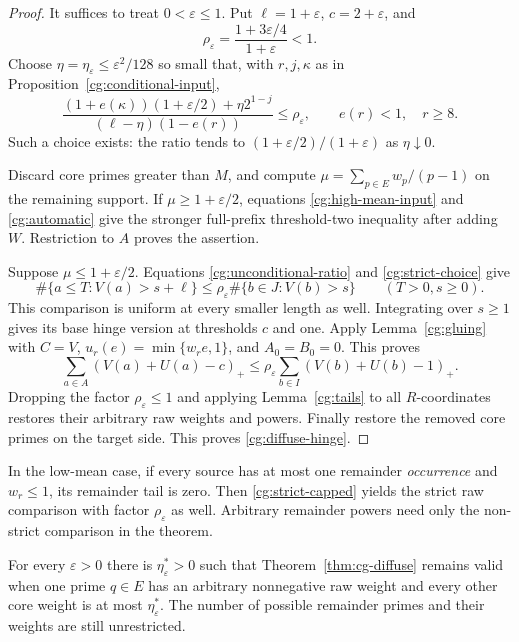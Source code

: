 \begin{proof}
It suffices to treat $0<\varepsilon\le1$. Put
$\ell=1+\varepsilon$, $c=2+\varepsilon$, and
\[
 \rho_\varepsilon=\frac{1+3\varepsilon/4}{1+\varepsilon}<1.
\]
Choose $\eta=\eta_\varepsilon\le\varepsilon^2/128$ so small
that, with $r,j,\kappa$ as in
Proposition~\ref{cg:conditional-input},
\begin{equation}
 \frac{(1+e(\kappa))(1+\varepsilon/2)+\eta2^{1-j}}
      {(\ell-\eta)(1-e(r))}\le\rho_\varepsilon,
 \qquad e(r)<1,\quad r\ge8.
 \label{cg:strict-choice}
\end{equation}
Such a choice exists: the ratio tends to
$(1+\varepsilon/2)/(1+\varepsilon)$ as $\eta\downarrow0$.

Discard core primes greater than $M$, and compute
$\mu=\sum_{p\in E}w_p/(p-1)$ on the remaining support.
If $\mu\ge1+\varepsilon/2$, equations
\eqref{cg:high-mean-input} and \eqref{cg:automatic} give the
stronger full-prefix threshold-two inequality after adding $W$.
Restriction to $A$ proves the assertion.

Suppose $\mu\le1+\varepsilon/2$. Equations
\eqref{cg:unconditional-ratio} and \eqref{cg:strict-choice} give
\[
 \#\{a\le T:V(a)>s+\ell\}
 \le\rho_\varepsilon\#\{b\in J:V(b)>s\}
 \qquad(T>0, s\ge0).
\]
This comparison is uniform at every smaller length as well.
Integrating over $s\ge1$ gives its base hinge version at thresholds
$c$ and one. Apply Lemma~\ref{cg:gluing} with $C=V$,
$u_r(e)=\min\{w_re,1\}$, and $A_0=B_0=0$. This proves
\begin{equation}
 \sum_{a\in A}(V(a)+U(a)-c)_+
 \le\rho_\varepsilon\sum_{b\in I}(V(b)+U(b)-1)_+.
 \label{cg:strict-capped}
\end{equation}
Dropping the factor $\rho_\varepsilon\le1$ and applying
Lemma~\ref{cg:tails} to all $R$-coordinates restores their arbitrary
raw weights and powers. Finally restore the removed core primes on the
target side. This proves \eqref{cg:diffuse-hinge}.
\end{proof}

In the low-mean case, if every source has at most one remainder
\emph{occurrence} and $w_r\le1$, its remainder tail is zero.
Then \eqref{cg:strict-capped} yields the strict raw comparison with
factor $\rho_\varepsilon$ as well. Arbitrary remainder powers need
only the non-strict comparison in the theorem.

\begin{theorem}
\label{thm:cg-one-heavy}
For every $\varepsilon>0$ there is $\eta_\varepsilon^*>0$ such
that Theorem~\ref{thm:cg-diffuse} remains valid when one prime
$q\in E$ has an arbitrary nonnegative raw weight and every other
core weight is at most $\eta_\varepsilon^*$. The number of
possible remainder primes and their weights are still unrestricted.
\end{theorem}

